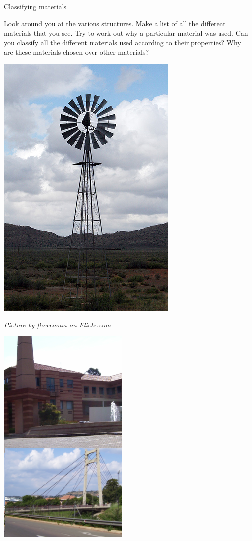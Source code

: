 \par
\begin{activity}{Classifying materials} {
\begin{minipage}{.4\textwidth}
Look around you at the various structures. Make a list of all the different materials that you see. Try to work out why a particular material was used. Can you classify all the different materials used according to their properties? Why are these materials chosen over other materials?
\end{minipage}
\begin{minipage}{.3\textwidth}
\begin{center}
 \includegraphics[height=.7\textwidth]{photos/windmillby-flowcomm-flickr.jpg}\par
\textit{Picture by flowcomm on Flickr.com}
\end{center}
\end{minipage}
\begin{minipage}{.3\textwidth}
\begin{center}
 \includegraphics[height=.7\textwidth]{photos/materials.png}\par
\end{center}
\end{minipage}
}
\end{activity}


